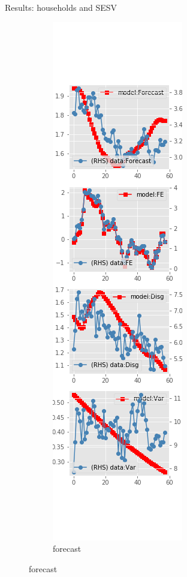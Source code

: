 \documentclass{beamer}
\begin{document}
\begin{frame}{Results: households and SESV}
	\begin{figure}[ht]
		\label{SESV_diag_SCE}
		\begin{subfigure}[b]{0.19\textwidth}
			\centering
			\caption{forecast}
			\includegraphics[width=\textwidth, height = 0.8\textheight]{figuresDraft/sce_se_est_sv_diag0.png}

\end{subfigure}
\end{figure}
\end{frame}
\end{document}
